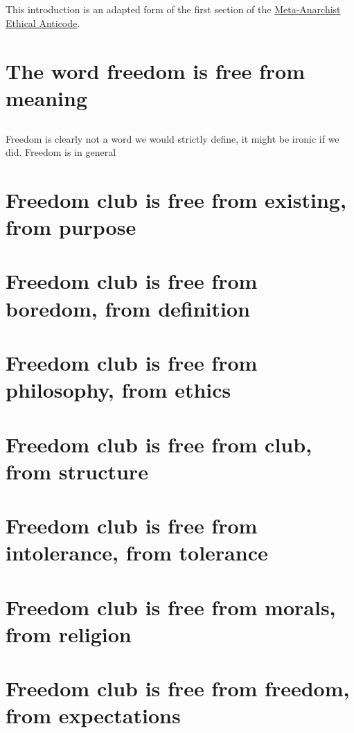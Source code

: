 \documentclass[letter]{article}
\begin{document}
\subsection{}
This introduction is an adapted form of the first section of the \href{https://www.reddit.com/r/metaanarchy/comments/iwlqz8/the_metaanarchist_ethical_anticode/}{Meta-Anarchist Ethical Anticode}.
\section{The word freedom is free from meaning}
\subsection{}
Freedom is clearly not a word we would strictly define, it might be ironic if we did. Freedom is in general
\section{Freedom club is free from existing, from purpose}
\section{Freedom club is free from boredom, from definition}
\section{Freedom club is free from philosophy, from ethics}
\section{Freedom club is free from club, from structure}
\section{Freedom club is free from intolerance, from tolerance}
\section{Freedom club is free from morals, from religion}
\section{Freedom club is free from freedom, from expectations}
\subsection{}
\end{document}
